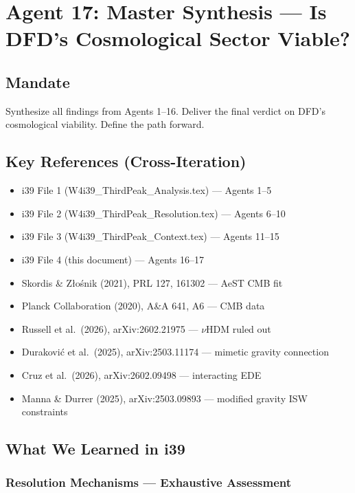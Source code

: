 \documentclass[11pt,a4paper]{article}
\begin{document}
\newpage
\section{Agent 17: Master Synthesis --- Is DFD's Cosmological Sector Viable?}
\label{sec:agent17}

\subsection{Mandate}

Synthesize all findings from Agents 1--16. Deliver the final verdict on DFD's cosmological viability. Define the path forward.

\subsection{Key References (Cross-Iteration)}

\begin{itemize}
\item i39 File 1 (W4i39\_ThirdPeak\_Analysis.tex) --- Agents 1--5
\item i39 File 2 (W4i39\_ThirdPeak\_Resolution.tex) --- Agents 6--10
\item i39 File 3 (W4i39\_ThirdPeak\_Context.tex) --- Agents 11--15
\item i39 File 4 (this document) --- Agents 16--17
\item Skordis \& Z{\l}o\'{s}nik (2021), PRL 127, 161302 --- AeST CMB fit
\item Planck Collaboration (2020), A\&A 641, A6 --- CMB data
\item Russell et al.\ (2026), arXiv:2602.21975 --- $\nu$HDM ruled out
\item Durakovi\'{c} et al.\ (2025), arXiv:2503.11174 --- mimetic gravity connection
\item Cruz et al.\ (2026), arXiv:2602.09498 --- interacting EDE
\item Manna \& Durrer (2025), arXiv:2503.09893 --- modified gravity ISW constraints
\end{itemize}

\subsection{What We Learned in i39}

\subsubsection{Resolution Mechanisms --- Exhaustive Assessment}
\end{document}
